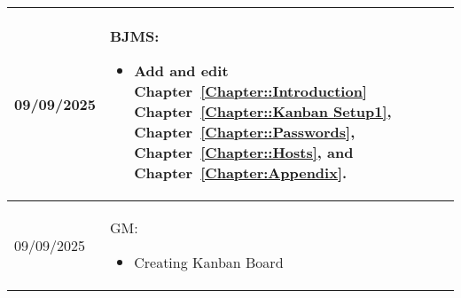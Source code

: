 \begin{longtable}{|l||p{13.5cm}|}
09/09/2025 & BJMS:
\begin{itemize}[topsep=0pt,itemsep=0pt,parsep=0pt,partopsep=0pt,leftmargin=12pt]
\item Add and edit 
Chapter~\ref{Chapter::Introduction}
Chapter~\ref{Chapter::Kanban Setup1},
Chapter~\ref{Chapter::Passwords},
Chapter~\ref{Chapter::Hosts},
and Chapter~\ref{Chapter:Appendix}.

\end{itemize} 
\\ \hline

09/09/2025 & GM:
\begin{itemize}[topsep=0pt,itemsep=0pt,parsep=0pt,partopsep=0pt,leftmargin=12pt]
\item Creating Kanban Board 
\end{itemize} 
\\ \hline



\end{longtable}



